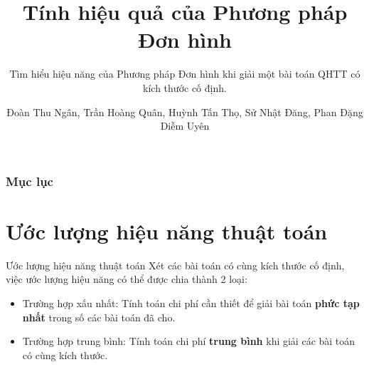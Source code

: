 \documentclass[10pt]{beamer}
\begin{document}
\author{Đoàn Thu Ngân, Trần Hoàng Quân, Huỳnh Tấn Thọ, Sử Nhật Đăng, Phan Đặng Diễm Uyên}
\title{Tính hiệu quả của Phương pháp Đơn hình}
\subtitle{Tìm hiểu hiệu năng của Phương pháp Đơn hình khi giải một bài toán QHTT có kích thước cố định.}
\subject{CSC10104 - Linear Programming}


\begin{frame}[plain]
\maketitle
\end{frame}

\begin{frame}
\frametitle{Mục lục}
\tableofcontents
\end{frame}

\section{Ước lượng hiệu năng thuật toán}
\begin{frame}{Ước lượng hiệu năng thuật toán}
Xét các bài toán có cùng kích thước cố định, việc ước lượng hiệu năng có thể được chia thành 2 loại:
\begin{itemize}
\item Trường hợp xấu nhất: Tính toán chi phí cần thiết để giải bài toán \textbf{phức tạp nhất} trong số các bài toán đã cho.
\item Trường hợp trung bình: Tính toán chi phí \textbf{trung bình} khi giải các bài toán có cùng kích thước.
\end{itemize}
\end{frame}
\end{document}
